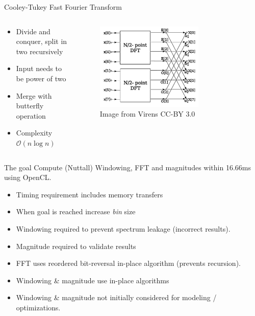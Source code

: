\documentclass{beamer}
\begin{document}
\begin{frame}{Cooley-Tukey Fast Fourier Transform}
	\begingroup
	\small
	\begin{columns}
		\begin{column}{0.45\textwidth}
			\begin{itemize}
				\item Divide and conquer, split in two recursively
				\item Input needs to be power of two
				\item Merge with butterfly operation
				\item Complexity $\mathcal{O}(n\log{}n)$
			\end{itemize}
		\end{column}
		\begin{column}{0.55\textwidth}
			\begin{figure}
				\includegraphics[width=0.7\textwidth,center]{resources/images/tukey.png}
				\caption{\tiny Image from Virens CC-BY 3.0}
			\end{figure}
		\end{column}
	\end{columns}
	\endgroup
\end{frame}

\begin{frame}{The goal}
	\begingroup
	\small
	Compute (Nuttall) Windowing, FFT and magnitudes within 16.66ms using
	OpenCL.
	\begin{itemize}
		\item Timing requirement includes memory transfers
		\item When goal is reached increase \textit{bin} size
		\item Windowing required to prevent spectrum leakage
		(incorrect results).
		\item Magnitude required to validate results
		\item FFT uses reordered bit-reversal in-place algorithm
		(prevents recursion).
		\item Windowing \& magnitude use in-place algorithms
		\item Windowing \& magnitude not initially considered for modeling /
		optimizations.
	\end{itemize}
	\endgroup
\end{frame}
\end{document}
